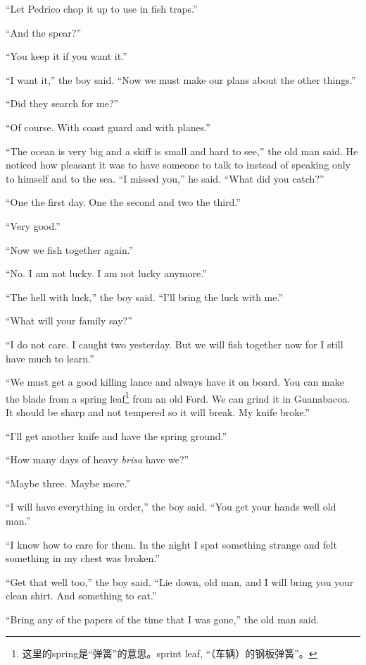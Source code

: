\documentclass[fontset=ubuntu,zihao=-4]{ctexrep}
\begin{document}
``Let Pedrico chop it up to use in fish traps.''

``And the spear?''

``You keep it if you want it.''

``I want it,'' the boy said. ``Now we must make our plans about the other things.''

``Did they search for me?''

``Of course. With coast guard and with planes.''

``The ocean is very big and a skiff is small and hard to see,'' the old man
said. He noticed how pleasant it was to have someone to talk to instead of
speaking only to himself and to the sea. ``I missed you,'' he said. ``What
did you catch?''

``One the first day. One the second and two the third.''

``Very good.''

``Now we fish together again.''

``No. I am not lucky. I am not lucky anymore.''

``The hell with luck,'' the boy said. ``I'll bring the luck with me.''

``What will your family say?''

``I do not care. I caught two yesterday. But we will fish together now for I
still have much to learn.''

``We must get a good killing \gls{lance} and always have it on board. You can make
the blade from a spring leaf\footnote{这里的spring是“弹簧”的意思。sprint
  leaf, “（车辆）的钢板弹簧”。} from an old Ford. We can \gls{grind} it
in Guanabacoa. It should be sharp and not \gls{tempered} so it will break.
My knife broke.''

``I'll get another knife and have the spring ground.''

``How many days of heavy \emph{brisa} have we?''

``Maybe three. Maybe more.''

``I will have everything in order,'' the boy said. ``You get your hands well
old man.''

``I know how to care for them. In the night I spat something strange and
felt something in my chest was broken.''

``Get that well too,'' the boy said. ``Lie down, old man, and I will bring
you your clean shirt. And something to eat.''

``Bring any of the papers of the time that I was gone,'' the old man said.
\end{document}

